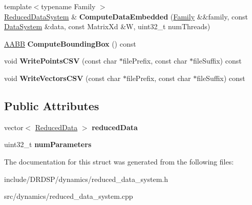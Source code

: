 \begin{DoxyCompactItemize}
\item 
\hypertarget{struct_d_r_d_s_p_1_1_reduced_data_system_a355ad1977811ebdf2924386c82c13f5c}{{\footnotesize template$<$typename Family $>$ }\\\hyperlink{struct_d_r_d_s_p_1_1_reduced_data_system}{Reduced\-Data\-System} \& {\bfseries Compute\-Data\-Embedded} (\hyperlink{struct_d_r_d_s_p_1_1_family}{Family} \&\&family, const \hyperlink{struct_d_r_d_s_p_1_1_data_system}{Data\-System} \&data, const Matrix\-Xd \&W, uint32\-\_\-t num\-Threads)}\label{struct_d_r_d_s_p_1_1_reduced_data_system_a355ad1977811ebdf2924386c82c13f5c}

\item 
\hypertarget{struct_d_r_d_s_p_1_1_reduced_data_system_a21853627f8229be7b5ec278faa31257e}{\hyperlink{struct_d_r_d_s_p_1_1_a_a_b_b}{A\-A\-B\-B} {\bfseries Compute\-Bounding\-Box} () const }\label{struct_d_r_d_s_p_1_1_reduced_data_system_a21853627f8229be7b5ec278faa31257e}

\item 
\hypertarget{struct_d_r_d_s_p_1_1_reduced_data_system_a3cee3fafe99a55ab69f54a97a6694b5b}{void {\bfseries Write\-Points\-C\-S\-V} (const char $\ast$file\-Prefix, const char $\ast$file\-Suffix) const }\label{struct_d_r_d_s_p_1_1_reduced_data_system_a3cee3fafe99a55ab69f54a97a6694b5b}

\item 
\hypertarget{struct_d_r_d_s_p_1_1_reduced_data_system_a90193676fbce0169bc7491ab686d79fa}{void {\bfseries Write\-Vectors\-C\-S\-V} (const char $\ast$file\-Prefix, const char $\ast$file\-Suffix) const }\label{struct_d_r_d_s_p_1_1_reduced_data_system_a90193676fbce0169bc7491ab686d79fa}

\end{DoxyCompactItemize}
\subsection*{Public Attributes}
\begin{DoxyCompactItemize}
\item 
\hypertarget{struct_d_r_d_s_p_1_1_reduced_data_system_ae4b8454c60cadde78da603168aa840f4}{vector$<$ \hyperlink{struct_d_r_d_s_p_1_1_reduced_data}{Reduced\-Data} $>$ {\bfseries reduced\-Data}}\label{struct_d_r_d_s_p_1_1_reduced_data_system_ae4b8454c60cadde78da603168aa840f4}

\item 
\hypertarget{struct_d_r_d_s_p_1_1_reduced_data_system_a18caccb6ac437c79aeb23e8b6c57389c}{uint32\-\_\-t {\bfseries num\-Parameters}}\label{struct_d_r_d_s_p_1_1_reduced_data_system_a18caccb6ac437c79aeb23e8b6c57389c}

\end{DoxyCompactItemize}


The documentation for this struct was generated from the following files\-:\begin{DoxyCompactItemize}
\item 
include/\-D\-R\-D\-S\-P/dynamics/reduced\-\_\-data\-\_\-system.\-h\item 
src/dynamics/reduced\-\_\-data\-\_\-system.\-cpp\end{DoxyCompactItemize}
